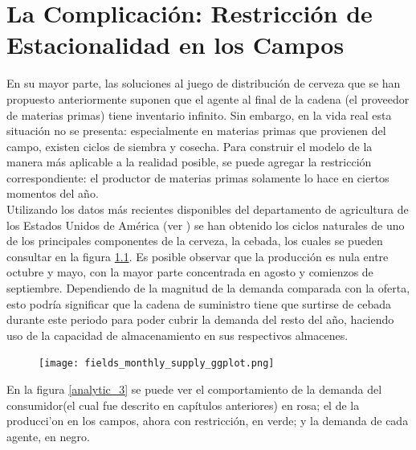 \chapter{La Complicaci\'on: Restricci\'on de Estacionalidad en los Campos}

En su mayor parte, las soluciones al juego de distribuci\'on de cerveza que se han propuesto anteriormente suponen que el agente al final de la cadena (el proveedor de materias primas) tiene inventario infinito. Sin embargo, en la vida real esta situaci\'on no se presenta: especialmente en materias primas que provienen del campo, existen ciclos de siembra y cosecha. Para construir el modelo de la manera m\'as aplicable a la realidad posible, se puede agregar la restricci\'on correspondiente: el productor de materias primas solamente lo hace en ciertos momentos del a\~no.\\

Utilizando los datos m\'as recientes disponibles del departamento de agricultura de los Estados Unidos de Am\'erica (ver \citet{USDA}) se han obtenido los ciclos naturales de uno de los principales componentes de la cerveza, la cebada, los cuales se pueden consultar en la figura \ref{fields}. Es posible observar que la producci\'on es nula entre octubre y mayo, con la mayor parte concentrada en agosto y comienzos de septiembre. Dependiendo de la magnitud de la demanda comparada con la oferta, esto podr\'ia significar que la cadena de suministro tiene que surtirse de cebada durante este periodo para poder cubrir la demanda del resto del a\~no, haciendo uso de la capacidad de almacenamiento en sus respectivos almacenes.\\

\begin{figure}[ht!]
\caption{ }
\label{fields}
\texttt{[image: fields\_monthly\_supply\_ggplot.png]}
\centering
\end{figure}

En la figura \ref{analytic_3} se puede ver el comportamiento de la demanda del consumidor(el cual fue descrito en cap\'itulos anteriores) en rosa; el de la producci'on en los campos, ahora con restricci\'on, en verde; y la demanda de cada agente, en negro. \\

